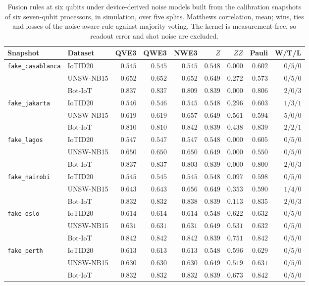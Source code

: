 \begin{table}[t]
\centering
\caption{Fusion rules at six qubits under device-derived noise models built from the
calibration snapshots of six seven-qubit processors, in simulation, over five splits.
Matthews correlation, mean; wins, ties and losses of the noise-aware rule against majority
voting. The kernel is measurement-free, so readout error and shot noise are excluded.}
\label{tab:s2device}
\footnotesize
\setlength{\tabcolsep}{3pt}
\begin{tabular}{@{}llrrrrrrr@{}}
\toprule
Snapshot & Dataset & QVE3 & QWE3 & NWE3 & $Z$ & $ZZ$ & Pauli & W/T/L \\
\midrule
\multirow{3}{*}{\texttt{fake\_casablanca}}
 & IoTID20 & $0.545$ & $0.545$ & $0.545$ & $0.548$ & $0.000$ & $0.602$ & $0/5/0$ \\
 & UNSW-NB15 & $0.652$ & $0.652$ & $0.652$ & $0.649$ & $0.272$ & $0.573$ & $0/5/0$ \\
 & Bot-IoT & $0.837$ & $0.837$ & $0.809$ & $0.839$ & $0.000$ & $0.806$ & $2/0/3$ \\
\midrule
\multirow{3}{*}{\texttt{fake\_jakarta}}
 & IoTID20 & $0.546$ & $0.546$ & $0.545$ & $0.548$ & $0.296$ & $0.603$ & $1/3/1$ \\
 & UNSW-NB15 & $0.619$ & $0.619$ & $0.657$ & $0.649$ & $0.561$ & $0.594$ & $5/0/0$ \\
 & Bot-IoT & $0.810$ & $0.810$ & $0.842$ & $0.839$ & $0.438$ & $0.839$ & $2/2/1$ \\
\midrule
\multirow{3}{*}{\texttt{fake\_lagos}}
 & IoTID20 & $0.547$ & $0.547$ & $0.547$ & $0.548$ & $0.000$ & $0.605$ & $0/5/0$ \\
 & UNSW-NB15 & $0.650$ & $0.650$ & $0.650$ & $0.649$ & $0.000$ & $0.550$ & $0/5/0$ \\
 & Bot-IoT & $0.837$ & $0.837$ & $0.803$ & $0.839$ & $0.000$ & $0.800$ & $2/0/3$ \\
\midrule
\multirow{3}{*}{\texttt{fake\_nairobi}}
 & IoTID20 & $0.545$ & $0.545$ & $0.545$ & $0.548$ & $0.097$ & $0.598$ & $0/5/0$ \\
 & UNSW-NB15 & $0.643$ & $0.643$ & $0.656$ & $0.649$ & $0.353$ & $0.590$ & $1/4/0$ \\
 & Bot-IoT & $0.832$ & $0.832$ & $0.838$ & $0.839$ & $0.113$ & $0.835$ & $2/0/3$ \\
\midrule
\multirow{3}{*}{\texttt{fake\_oslo}}
 & IoTID20 & $0.614$ & $0.614$ & $0.614$ & $0.548$ & $0.622$ & $0.632$ & $0/5/0$ \\
 & UNSW-NB15 & $0.631$ & $0.631$ & $0.631$ & $0.649$ & $0.531$ & $0.632$ & $0/5/0$ \\
 & Bot-IoT & $0.842$ & $0.842$ & $0.842$ & $0.839$ & $0.751$ & $0.842$ & $0/5/0$ \\
\midrule
\multirow{3}{*}{\texttt{fake\_perth}}
 & IoTID20 & $0.613$ & $0.613$ & $0.613$ & $0.548$ & $0.596$ & $0.629$ & $0/5/0$ \\
 & UNSW-NB15 & $0.630$ & $0.630$ & $0.630$ & $0.649$ & $0.519$ & $0.631$ & $0/5/0$ \\
 & Bot-IoT & $0.832$ & $0.832$ & $0.832$ & $0.839$ & $0.673$ & $0.842$ & $0/5/0$ \\
\bottomrule
\end{tabular}
\end{table}

